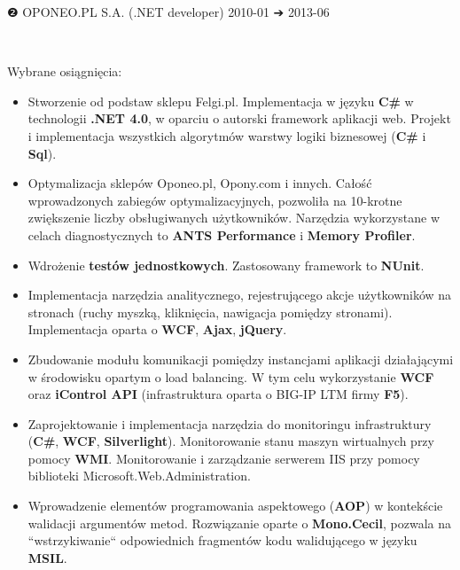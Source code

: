 \documentclass[a4paper,11pt]{article}
\newcommand{\cvEnuItemBox}[1]
{%
	\hspace{26pt}\parbox{.93\textwidth}{#1}
}
\newcommand{\cvSectionEntry}[1]
{%
	\vspace{-1pt}\noindent\setlength{\fboxsep}{0pt}\setlength{\fboxrule}{0pt}%
	\colorbox{bg}
	{%
		\color{fg}%
		\begin{minipage}[t]{\textwidth}
			#1 %
		\end{minipage}%
	}%
}
\newcommand{\cvSectionEntryHeader}[4]
{%
	\vspace{8pt}\hspace{26pt}\parbox{.93\textwidth}
	{%
		\fontsize{13pt}{1em}\selectfont #1 \hspace{2pt} #2 \hfill #3 {\segoesym ➔} #4 %
	}\\
}
\newcommand{\cvSectionEntryBody}[2]
{%
	\cvEnuItemBox{\hspace{27pt}#1#2}
}
\begin{document}
\pagebreak\vspace*{-11pt}

\cvSectionEntry
{
	\cvSectionEntryHeader{❷}{OPONEO.PL S.A. (.NET developer)}{2010-01}{2013-06}

	\cvSectionEntryBody{Wybrane osiągnięcia:}
	{
		\begin{itemize}
			\setlength\itemsep{0em}
			\item Stworzenie od podstaw sklepu Felgi.pl. Implementacja w języku \textbf{C\#} w technologii \textbf{.NET 4.0}, w oparciu o autorski framework aplikacji web. Projekt i implementacja wszystkich algorytmów warstwy logiki biznesowej (\textbf{C\#} i \textbf{Sql}).
			\item Optymalizacja sklepów Oponeo.pl, Opony.com i innych. Całość wprowadzonych zabiegów optymalizacyjnych, pozwoliła na 10-krotne zwiększenie liczby obsługiwanych użytkowników. Narzędzia wykorzystane w celach diagnostycznych to \textbf{ANTS Performance} i \textbf{Memory Profiler}.
			\item Wdrożenie \textbf{testów jednostkowych}. Zastosowany framework to \textbf{NUnit}.
			\item Implementacja narzędzia analitycznego, rejestrującego akcje użytkowników na stronach (ruchy myszką, kliknięcia, nawigacja pomiędzy stronami). Implementacja oparta o \textbf{WCF}, \textbf{Ajax}, \textbf{jQuery}.
			\item Zbudowanie modułu komunikacji pomiędzy instancjami aplikacji działającymi w środowisku opartym o load balancing. W tym celu wykorzystanie \textbf{WCF} oraz \textbf{iControl API} (infrastruktura oparta o BIG-IP LTM firmy \textbf{F5}).
			\item Zaprojektowanie i implementacja narzędzia do monitoringu infrastruktury (\textbf{C\#}, \textbf{WCF}, \textbf{Silverlight}). Monitorowanie stanu maszyn wirtualnych przy pomocy \textbf{WMI}. Monitorowanie i zarządzanie serwerem IIS przy pomocy biblioteki Microsoft.Web.Administration.
			\item Wprowadzenie elementów programowania aspektowego (\textbf{AOP}) w kontekście walidacji argumentów metod. Rozwiązanie oparte o \textbf{Mono.Cecil}, pozwala na ``wstrzykiwanie`` odpowiednich fragmentów kodu walidującego w języku \textbf{MSIL}.
		\end{itemize}
	}
}
\end{document}

